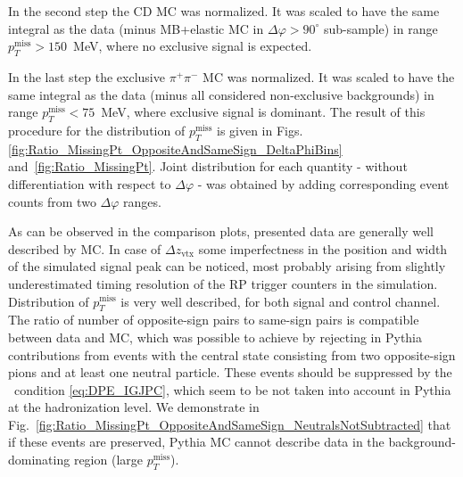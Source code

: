 In the second step the CD MC was normalized. It was scaled to have the same integral as the data (minus MB+elastic MC in $\Delta\varphi>90^{\circ}$ sub-sample) in range $p_{T}^{\text{miss}}>150$~MeV, where no exclusive signal is expected.

In the last step the exclusive $\pi^{+}\pi^{-}$ MC was normalized. It was scaled to have the same integral as the data (minus all considered non-exclusive backgrounds) in range $p_{T}^{\text{miss}}<75$~MeV, where exclusive signal is dominant. The result of this procedure for the distribution of $p_{T}^{\text{miss}}$ is given in Figs.\ref{fig:Ratio_MissingPt_OppositeAndSameSign_DeltaPhiBins} and~\ref{fig:Ratio_MissingPt}. Joint distribution for each quantity - without differentiation with respect to $\Delta\varphi$ - was obtained by adding corresponding event counts from two $\Delta\varphi$ ranges.

As can be observed in the comparison plots, presented data are generally well described by MC. In case of $\Delta z_{\text{vtx}}$ some imperfectness in the position and width of the simulated signal peak can be noticed, most probably arising from slightly underestimated timing resolution of the RP trigger counters in the simulation. Distribution of $p_{T}^{\text{miss}}$ is very well described, for both signal and control channel. The ratio of number of opposite-sign pairs to same-sign pairs is compatible between data and MC, which was possible to achieve by rejecting in Pythia contributions from events with the central state consisting from two opposite-sign pions and at least one neutral particle. These events should be suppressed by the \DPE\ condition \eqref{eq:DPE_IGJPC}, which seem to be not taken into account in Pythia at the hadronization level. We demonstrate in Fig.~\ref{fig:Ratio_MissingPt_OppositeAndSameSign_NeutralsNotSubtracted} that if these events are preserved, Pythia MC cannot describe data in the background-dominating region (large $p_{T}^{\text{miss}}$).


